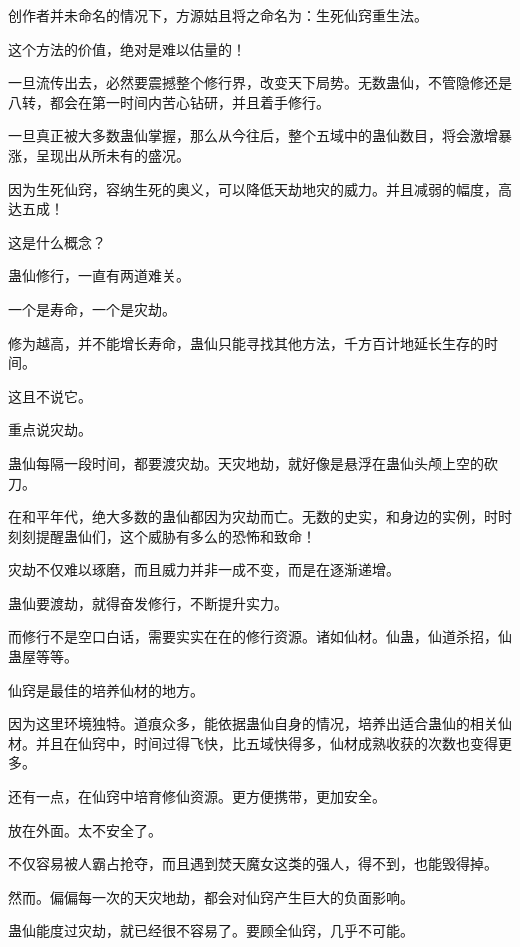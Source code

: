 
\begin{this_body}



创作者并未命名的情况下，方源姑且将之命名为：生死仙窍重生法。

这个方法的价值，绝对是难以估量的！

一旦流传出去，必然要震撼整个修行界，改变天下局势。无数蛊仙，不管隐修还是八转，都会在第一时间内苦心钻研，并且着手修行。

一旦真正被大多数蛊仙掌握，那么从今往后，整个五域中的蛊仙数目，将会激增暴涨，呈现出从所未有的盛况。

因为生死仙窍，容纳生死的奥义，可以降低天劫地灾的威力。并且减弱的幅度，高达五成！

这是什么概念？

蛊仙修行，一直有两道难关。

一个是寿命，一个是灾劫。

修为越高，并不能增长寿命，蛊仙只能寻找其他方法，千方百计地延长生存的时间。

这且不说它。

重点说灾劫。

蛊仙每隔一段时间，都要渡灾劫。天灾地劫，就好像是悬浮在蛊仙头颅上空的砍刀。

在和平年代，绝大多数的蛊仙都因为灾劫而亡。无数的史实，和身边的实例，时时刻刻提醒蛊仙们，这个威胁有多么的恐怖和致命！

灾劫不仅难以琢磨，而且威力并非一成不变，而是在逐渐递增。

蛊仙要渡劫，就得奋发修行，不断提升实力。

而修行不是空口白话，需要实实在在的修行资源。诸如仙材。仙蛊，仙道杀招，仙蛊屋等等。

仙窍是最佳的培养仙材的地方。

因为这里环境独特。道痕众多，能依据蛊仙自身的情况，培养出适合蛊仙的相关仙材。并且在仙窍中，时间过得飞快，比五域快得多，仙材成熟收获的次数也变得更多。

还有一点，在仙窍中培育修仙资源。更方便携带，更加安全。

放在外面。太不安全了。

不仅容易被人霸占抢夺，而且遇到焚天魔女这类的强人，得不到，也能毁得掉。

然而。偏偏每一次的天灾地劫，都会对仙窍产生巨大的负面影响。

蛊仙能度过灾劫，就已经很不容易了。要顾全仙窍，几乎不可能。


\end{this_body}
